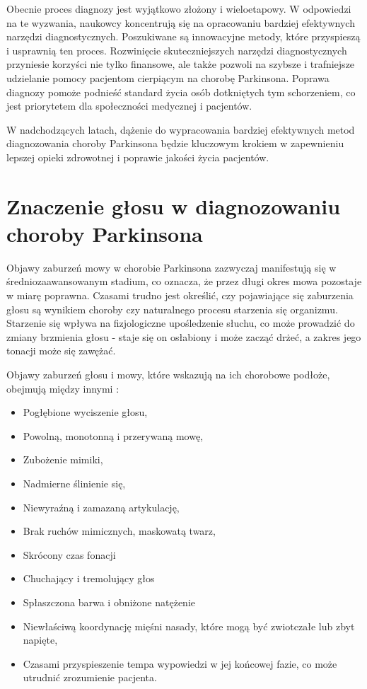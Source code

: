Obecnie proces diagnozy jest wyjątkowo złożony i wieloetapowy.
W odpowiedzi na te wyzwania, naukowcy koncentrują się na opracowaniu bardziej efektywnych narzędzi diagnostycznych.
Poszukiwane są innowacyjne metody, które przyspieszą i usprawnią ten proces.
Rozwinięcie skuteczniejszych narzędzi diagnostycznych przyniesie korzyści nie tylko finansowe, ale także pozwoli na szybsze i trafniejsze udzielanie pomocy pacjentom cierpiącym na chorobę Parkinsona.
Poprawa diagnozy pomoże podnieść standard życia osób dotkniętych tym schorzeniem, co jest priorytetem dla społeczności medycznej i pacjentów.

W nadchodzących latach, dążenie do wypracowania bardziej efektywnych metod diagnozowania choroby Parkinsona będzie kluczowym krokiem w zapewnieniu lepszej opieki zdrowotnej i poprawie jakości życia pacjentów.


\section{Znaczenie głosu w diagnozowaniu choroby Parkinsona}
\label{sec:znaczenie_glosu}

Objawy zaburzeń mowy w chorobie Parkinsona zazwyczaj manifestują się w średniozaawansowanym stadium, co oznacza, że przez długi okres mowa pozostaje w miarę poprawna.
Czasami trudno jest określić, czy pojawiające się zaburzenia głosu są wynikiem choroby czy naturalnego procesu starzenia się organizmu.
Starzenie się wpływa na fizjologiczne upośledzenie słuchu, co może prowadzić do zmiany brzmienia głosu - staje się on osłabiony i może zacząć
drżeć, a zakres jego tonacji może się zawężać.

\vspace{0.5cm}
Objawy zaburzeń głosu i mowy, które wskazują na ich chorobowe podłoże, obejmują między innymi \cite{Szurek_2018, Kuryłowicz_2019}:
\begin{itemize}[itemsep=0.5pt]
	\item Pogłębione wyciszenie głosu,
	\item Powolną, monotonną i przerywaną mowę,
	\item Zubożenie mimiki,
	\item Nadmierne ślinienie się,
	\item Niewyraźną i zamazaną artykulację,
	\item Brak ruchów mimicznych, maskowatą twarz,
	\item Skrócony czas fonacji
	\item Chuchający i tremolujący głos
	\item Spłaszczona barwa i obniżone natężenie
	\item Niewłaściwą koordynację mięśni nasady, które mogą być zwiotczałe lub zbyt napięte,
	\item Czasami przyspieszenie tempa wypowiedzi w jej końcowej fazie, co może utrudnić zrozumienie pacjenta.
\end{itemize}

